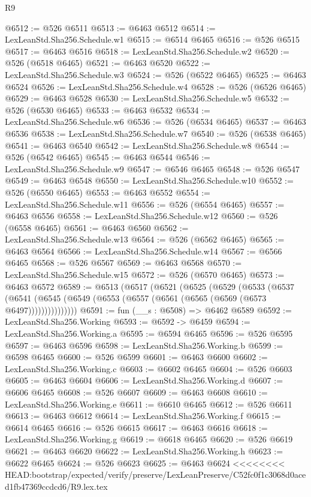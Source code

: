 \begin{lexlean}{R9}
\begin{coremodule}
{{{{{{{{{{{{{{{{{{{{{{{{{{{{{{{{{{{{{{{{{{{{{{{{{{{{{{{{{{{{{{{{{{{{{{{{{{{{{{{{{{{{@6512 := @526 @6511
@6513 := @6463 @6512
@6514 := LexLeanStd.Sha256.Schedule.w1
@6515 := @6514 @6465
@6516 := @526 @6515
@6517 := @6463 @6516
@6518 := LexLeanStd.Sha256.Schedule.w2
@6520 := @526 (@6518 @6465)
@6521 := @6463 @6520
@6522 := LexLeanStd.Sha256.Schedule.w3
@6524 := @526 (@6522 @6465)
@6525 := @6463 @6524
@6526 := LexLeanStd.Sha256.Schedule.w4
@6528 := @526 (@6526 @6465)
@6529 := @6463 @6528
@6530 := LexLeanStd.Sha256.Schedule.w5
@6532 := @526 (@6530 @6465)
@6533 := @6463 @6532
@6534 := LexLeanStd.Sha256.Schedule.w6
@6536 := @526 (@6534 @6465)
@6537 := @6463 @6536
@6538 := LexLeanStd.Sha256.Schedule.w7
@6540 := @526 (@6538 @6465)
@6541 := @6463 @6540
@6542 := LexLeanStd.Sha256.Schedule.w8
@6544 := @526 (@6542 @6465)
@6545 := @6463 @6544
@6546 := LexLeanStd.Sha256.Schedule.w9
@6547 := @6546 @6465
@6548 := @526 @6547
@6549 := @6463 @6548
@6550 := LexLeanStd.Sha256.Schedule.w10
@6552 := @526 (@6550 @6465)
@6553 := @6463 @6552
@6554 := LexLeanStd.Sha256.Schedule.w11
@6556 := @526 (@6554 @6465)
@6557 := @6463 @6556
@6558 := LexLeanStd.Sha256.Schedule.w12
@6560 := @526 (@6558 @6465)
@6561 := @6463 @6560
@6562 := LexLeanStd.Sha256.Schedule.w13
@6564 := @526 (@6562 @6465)
@6565 := @6463 @6564
@6566 := LexLeanStd.Sha256.Schedule.w14
@6567 := @6566 @6465
@6568 := @526 @6567
@6569 := @6463 @6568
@6570 := LexLeanStd.Sha256.Schedule.w15
@6572 := @526 (@6570 @6465)
@6573 := @6463 @6572
@6589 := @6513
    (@6517
      (@6521
        (@6525
          (@6529
            (@6533
              (@6537
                (@6541 (@6545 (@6549 (@6553 (@6557 (@6561 (@6565 (@6569 (@6573 @6497)))))))))))))))
@6591 := fun (__s : @6508) => @6462 @6589
@6592 := LexLeanStd.Sha256.Working
@6593 := @6592 -> @6459
@6594 := LexLeanStd.Sha256.Working.a
@6595 := @6594 @6465
@6596 := @526 @6595
@6597 := @6463 @6596
@6598 := LexLeanStd.Sha256.Working.b
@6599 := @6598 @6465
@6600 := @526 @6599
@6601 := @6463 @6600
@6602 := LexLeanStd.Sha256.Working.c
@6603 := @6602 @6465
@6604 := @526 @6603
@6605 := @6463 @6604
@6606 := LexLeanStd.Sha256.Working.d
@6607 := @6606 @6465
@6608 := @526 @6607
@6609 := @6463 @6608
@6610 := LexLeanStd.Sha256.Working.e
@6611 := @6610 @6465
@6612 := @526 @6611
@6613 := @6463 @6612
@6614 := LexLeanStd.Sha256.Working.f
@6615 := @6614 @6465
@6616 := @526 @6615
@6617 := @6463 @6616
@6618 := LexLeanStd.Sha256.Working.g
@6619 := @6618 @6465
@6620 := @526 @6619
@6621 := @6463 @6620
@6622 := LexLeanStd.Sha256.Working.h
@6623 := @6622 @6465
@6624 := @526 @6623
@6625 := @6463 @6624
<<<<<<<< HEAD:bootstrap/expected/verify/preserve/LexLeanPreserve/C52fc0f1c3068d0aced1fb47369ccdcd6/R9.lex.tex
}}}}}}}}}}}}}}}}}}}}}}}}}}}}}}}}}}}}}}}}}}}}}}}}}}}}}}}}}}}}}}}}}}}}}}}}}}}}}}}}}}}}
\end{coremodule}
\end{lexlean}
